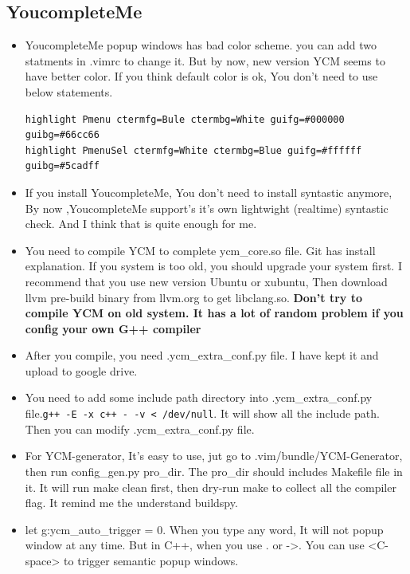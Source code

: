 \documentclass[a4paper,12pt,twoside]{book}
\begin{document}
\begin{itemize}
\begin{itemize}
\subsection{YoucompleteMe}

\begin{itemize}
\item YoucompleteMe popup windows has bad color scheme. you can add two statments in .vimrc to change it. But by now, new version YCM seems to have better color. If you think default color is ok, You don't need to use below statements. 
\begin{verbatim}
highlight Pmenu ctermfg=Bule ctermbg=White guifg=#000000 guibg=#66cc66
highlight PmenuSel ctermfg=White ctermbg=Blue guifg=#ffffff guibg=#5cadff
\end{verbatim}

\item If you install YoucompleteMe, You don't need to install syntastic anymore, By now ,YoucompleteMe support's it's own lightwight (realtime) syntastic check. And I think that is quite enough for me.  

\item You need to compile YCM to complete ycm\_core.so file. Git has install explanation. If you system is too old, you should upgrade your system first. I recommend that you use new version Ubuntu or xubuntu, Then download llvm pre-build binary from llvm.org to get libclang.so. \textbf{Don't try to compile YCM on old system. It has a lot of random problem if you config your own G++ compiler}

\item After you compile, you need .ycm\_extra\_conf.py file. I have kept it and upload to google drive.

\item You need to add some include path directory into .ycm\_extra\_conf.py file.\verb=g++ -E -x c++ - -v < /dev/null=. It will show all the include path. Then you can modify .ycm\_extra\_conf.py file.

\item For YCM-generator, It's easy to use, jut go to .vim/bundle/YCM-Generator, then run config\_gen.py pro\_dir. The pro\_dir should includes Makefile file in it.  It will run make clean first, then dry-run make to collect all the compiler flag. It remind me the understand buildspy. 

\item let g:ycm\_auto\_trigger = 0. When you type any word, It will not popup window at any time. But in C++, when you use . or ->. You can use <C-space> to trigger semantic popup windows.


\end{itemize}
\end{itemize}
\end{itemize}
\end{document}
